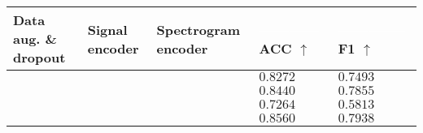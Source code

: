\begin{tabular}{>{\centering\arraybackslash}p{}>{\centering\arraybackslash}p{}>{\centering\arraybackslash}p{}>{\raggedright\arraybackslash}p{}>{\raggedright\arraybackslash}p{}}
    \hline
	Data aug. \& dropout  & Signal encoder & Spectrogram encoder & \textcolor{white}{------------} ACC $\uparrow$ & \textcolor{white}{--------------} F1 $\uparrow$ \\
	\hline
	\textcolor{red}{\xmark} & \textcolor{tud3d}{\cmark} & \textcolor{tud3d}{\cmark} & $0.8272$ & $0.7493$ \\
	\textcolor{tud3d}{\cmark} & \textcolor{red}{\xmark} & \textcolor{tud3d}{\cmark} & $0.8440$ & $0.7855$ \\
	\textcolor{tud3d}{\cmark} & \textcolor{tud3d}{\cmark} & \textcolor{red}{\xmark} & $0.7264$ & $0.5813$ \\
	\textcolor{tud3d}{\cmark} & \textcolor{tud3d}{\cmark} & \textcolor{tud3d}{\cmark} & $\mathbf{0.8560}$ & $\mathbf{0.7938}$ \\
	\hline
\end{tabular}